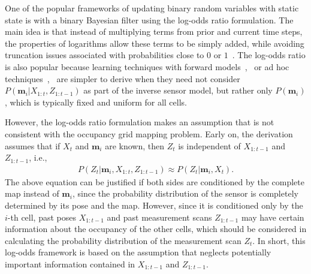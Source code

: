 \documentclass[letterpaper, 10pt, conference]{ieeeconf}
\begin{document}
One of the popular frameworks of updating binary random variables with static state is with a binary Bayesian filter using the log-odds ratio formulation.
The main idea is that instead of multiplying terms from prior and current time steps, the properties of logarithms allow these terms to be simply added, while avoiding truncation issues associated with probabilities close to $0$ or $1$~\cite{ThrBurFox05}.
The log-odds ratio is also popular because learning techniques with forward models~\cite{Thr01},~\cite{Thr03} or ad hoc techniques~\cite{MorElf85},~\cite{Elf89} are simpler to derive when they need not consider $P(\mathbf{m}_i|X_{1:t},Z_{1:t-1})$ as part of the inverse sensor model, but rather only $P(\mathbf{m}_i)$, which is typically fixed and uniform for all cells.

However, the log-odds ratio formulation makes an assumption that is not consistent with the occupancy grid mapping problem. Early on, the derivation assumes that if $X_t$ and $\mathbf{m}_i$ are known, then $Z_t$ is independent of $X_{1:t-1}$ and $Z_{1:t-1}$, i.e.,
\begin{align}
\label{eqn:AssumptionEarly}
P(Z_t|\mathbf{m}_i,X_{1:t},Z_{1:t-1})\approx P(Z_t|\mathbf{m}_i,X_t).
\end{align}
The above equation can be justified if both sides are conditioned by the complete map instead of $\mathbf{m}_i$, since the probability distribution of the sensor is completely determined by its pose and the map. However, since it is conditioned only by the $i$-th cell, past poses $X_{1:t-1}$ and past measurement scans $Z_{1:t-1}$ may have certain information about the occupancy of the other cells, which should be considered in calculating the probability distribution of the measurement scan $Z_t$.  In short, this log-odds framework is based on the assumption that neglects potentially important information contained in $X_{1:t-1}$ and $Z_{1:t-1}$.


\end{document}

